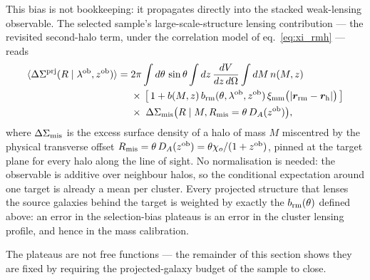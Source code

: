 \documentclass[a4paper, 11pt]{article}
\newcommand{\lob}{\lambda^{\rm ob}}
\newcommand{\zob}{z^{\rm ob}}
\newcommand{\ximm}{\xi_{\rm mm}}
\newcommand{\avg}[1]{\langle #1 \rangle}
\newcommand{\brm}{b_{\rm rm}}
\newcommand{\DSprj}{\Delta\Sigma^{\rm prj}}
\newcommand{\DSmis}{\Delta\Sigma_{\rm mis}}
\newcommand{\Rmis}{R_{\rm mis}}
\begin{document}
This bias is not bookkeeping: it propagates directly into the
stacked weak-lensing observable. The selected sample's
large-scale-structure lensing contribution --- the revisited
second-halo term, under the correlation model of
eq.~\eqref{eq:xi_rmh} --- reads
\begin{align}
\avg{\DSprj(R\mid\lob,\zob)} =\;
&2\pi\int d\theta\,\sin\theta
\int dz\,\frac{dV}{dz\,d\Omega}
\int dM\,n(M,z)
\notag\\
&\times\,
\bigl[\,1 + b(M,z)\,\brm(\theta,\lob,\zob)\,
\ximm\big(|\bm{r}_{\rm rm}-\bm{r}_{\rm h}|\big)\,\bigr]
\notag\\
&\times\;
\DSmis\bigl(R\mid M,\Rmis=\theta\,D_A(\zob)\bigr),
\label{eq:DSprj}
\end{align}
where $\DSmis$ is the excess surface density of a halo of mass
$M$ miscentred by the physical transverse offset
$\Rmis = \theta\,D_A(\zob) = \theta\chi_o/(1+\zob)$, pinned at
the target plane for every halo along the line of sight. No
normalisation is needed: the observable is additive over
neighbour halos, so the conditional expectation around one
target is already a mean per cluster. Every
projected structure that lenses the source galaxies behind the
target is weighted by exactly the $\brm(\theta)$ defined above:
an error in the selection-bias plateaus is an error in the
cluster lensing profile, and hence in the mass calibration.

The plateaus are not free functions --- the remainder of this
section shows they are fixed by requiring the projected-galaxy
budget of the sample to close.
\end{document}
